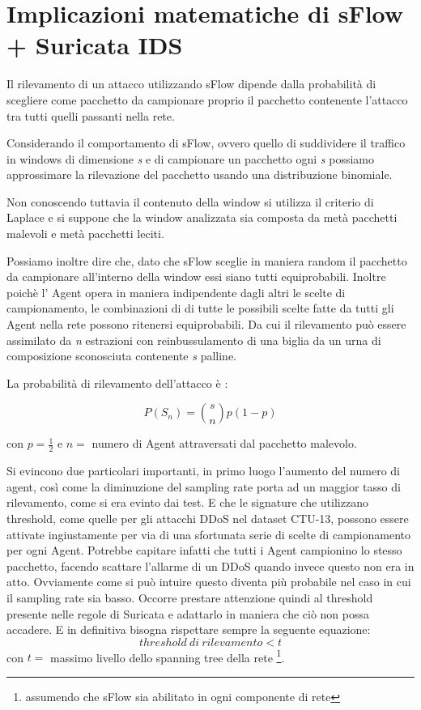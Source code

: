 \documentclass[12pt,a4paper,openright,twoside]{report}
\begin{document}
\section{Implicazioni matematiche di sFlow + Suricata IDS}

Il rilevamento di un attacco utilizzando sFlow dipende dalla probabilit\`a
di scegliere come pacchetto da campionare proprio il pacchetto contenente
l'attacco tra tutti quelli passanti nella rete.

Considerando il comportamento di sFlow, ovvero quello di suddividere il traffico
in windows di dimensione {\it s} e di campionare un pacchetto ogni {\it s} possiamo
approssimare la rilevazione del pacchetto usando una distribuzione binomiale.

Non conoscendo tuttavia il contenuto della window si utilizza il criterio di Laplace
e si suppone che la window analizzata sia composta da met\`a pacchetti malevoli e
met\`a pacchetti leciti.

Possiamo inoltre dire che, dato che sFlow sceglie in maniera random il pacchetto da campionare
all'interno della window essi siano tutti equiprobabili. Inoltre poich\`e l' Agent
opera in maniera indipendente dagli altri le scelte di campionamento, le combinazioni di
di tutte le possibili scelte fatte da tutti gli Agent nella rete possono ritenersi
equiprobabili. Da cui il rilevamento pu\`o essere assimilato da {\it n} estrazioni con reinbussulamento di una biglia da un urna
di composizione sconosciuta contenente {\it s} palline.

La probabilit\`a di rilevamento dell'attacco \`e :

\begin{equation}
  P(S{_n})= \binom{s}{n} p (1 - p)
\end{equation}

con $p=\frac{1}{2}$ e $n=$ numero di Agent attraversati dal pacchetto malevolo.

Si evincono due particolari importanti, in primo luogo l'aumento del numero di agent,
cos\`i come la diminuzione del sampling rate porta ad un maggior tasso di rilevamento, come si era
evinto dai test. E che le signature che utilizzano
threshold, come quelle per gli attacchi DDoS nel dataset CTU-13, possono essere attivate ingiustamente
per via di una sfortunata serie di scelte di campionamento per ogni Agent. Potrebbe capitare infatti
che tutti i Agent campionino lo stesso pacchetto, facendo scattare l'allarme di un
DDoS quando invece questo non era in atto. Ovviamente come si pu\`o intuire questo diventa pi\`u probabile nel caso in cui il sampling
rate sia basso.
Occorre prestare attenzione quindi al threshold presente
nelle regole di Suricata e adattarlo in maniera che ci\`o non possa accadere.
E in definitiva bisogna rispettare sempre la seguente equazione:
\begin{equation}
    threshold\ di\ rilevamento < t
\end{equation}
con $t=$ massimo livello dello spanning tree della rete \footnote{assumendo che sFlow sia abilitato in ogni componente
di rete}.
\end{document}
